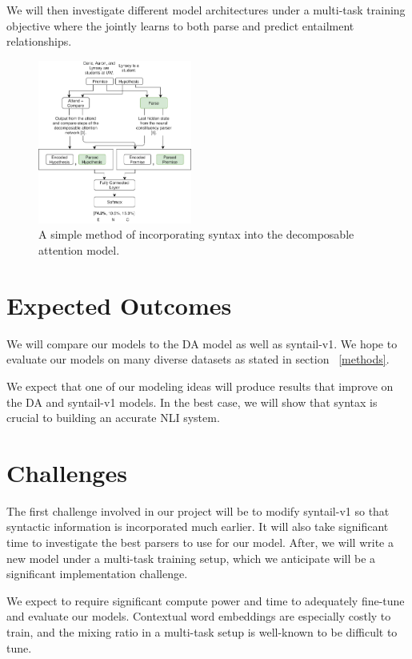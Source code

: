 \documentclass[11pt,a4paper]{article}
\begin{document}
We will then investigate different model architectures under a multi-task
training objective where the jointly learns to both parse and predict
entailment relationships.

\begin{figure}[h]
  \includegraphics[width=0.45\textwidth]{v1}
  \caption{A simple method of incorporating syntax into the decomposable
    attention model.}
\label{figure:v1}
\end{figure}

\section{Expected Outcomes}

We will compare our models to the DA model as well as syntail-v1. We hope to
evaluate our models on many diverse datasets as stated in section
~\ref{methods}.

We expect that one of our modeling ideas will produce results that improve on
the DA and syntail-v1 models. In the best case, we will show that syntax is
crucial to building an accurate NLI system.

\section{Challenges}

The first challenge involved in our project will be to modify syntail-v1
so that syntactic information is incorporated much earlier. It will also take
significant time to investigate the best parsers to use for our model.
After, we will write a new model under a multi-task training setup, which we
anticipate will be a significant implementation challenge.

We expect to require significant compute power and time to adequately fine-tune
and evaluate our models. Contextual word embeddings are especially costly to
train, and the mixing ratio in a multi-task setup is well-known to be
difficult to tune.



\end{document}
